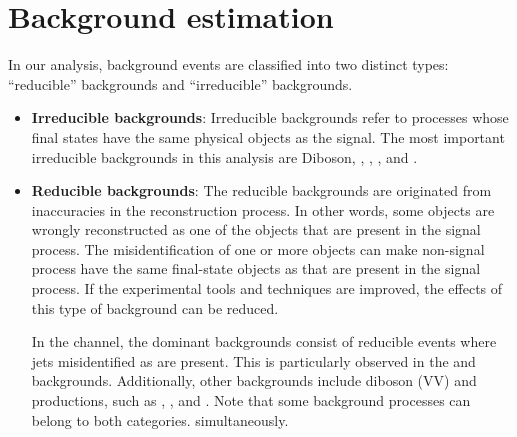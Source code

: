 \section{Background estimation}
\label{sec:ChaptH:Bkg}
In our analysis, background events are classified into two distinct types:  
``reducible'' backgrounds and ``irreducible'' backgrounds.
\begin{itemize}
	\item \textbf{Irreducible backgrounds}: Irreducible backgrounds refer to processes whose 
		final states have the same physical objects as the signal.
		The most important irreducible backgrounds in this 
		analysis are Diboson, \tW, \ttZ, \ttH, \ttW and \tZq.
	\item \textbf{Reducible backgrounds}:  The reducible backgrounds 
		are originated from inaccuracies in the reconstruction process. In other words,
		some objects are wrongly reconstructed as one of the objects that are present in the signal process.
		The misidentification of one or more objects can make non-signal process have
		the same final-state objects as that are present in the signal process. 
		If the experimental tools and techniques are improved, the effects of this type of background
		can be reduced.
		
		In the \dileptau channel, the dominant backgrounds consist of reducible events 
		where jets misidentified as \tauhad are present. This is particularly observed in 
		the \ttbar and \Zjets backgrounds. Additionally, other backgrounds include
		diboson (VV) and \ttX productions, such 
		as \ttH, \ttZ, and \ttW. Note that some background processes can belong to both categories.
		simultaneously.  
		
\end{itemize}

